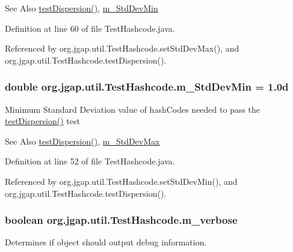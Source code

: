 \begin{DoxySeeAlso}{See Also}
\hyperlink{classorg_1_1jgap_1_1util_1_1_test_hashcode_a08e541143a78fdf8902cedac17e1f65d}{test\-Dispersion()}, \hyperlink{classorg_1_1jgap_1_1util_1_1_test_hashcode_a1601b935a90e3905a6107d9b88bbb47a}{m\-\_\-\-Std\-Dev\-Min} 
\end{DoxySeeAlso}


Definition at line 60 of file Test\-Hashcode.\-java.



Referenced by org.\-jgap.\-util.\-Test\-Hashcode.\-set\-Std\-Dev\-Max(), and org.\-jgap.\-util.\-Test\-Hashcode.\-test\-Dispersion().

\hypertarget{classorg_1_1jgap_1_1util_1_1_test_hashcode_a1601b935a90e3905a6107d9b88bbb47a}{
\subsubsection[{m\-\_\-\-Std\-Dev\-Min}]{\setlength{\rightskip}{0pt plus 5cm}double org.\-jgap.\-util.\-Test\-Hashcode.\-m\-\_\-\-Std\-Dev\-Min = 1.\-0d\hspace{0.3cm}{\ttfamily [private]}}}\label{classorg_1_1jgap_1_1util_1_1_test_hashcode_a1601b935a90e3905a6107d9b88bbb47a}
Minimum Standard Deviation value of hash\-Codes needed to pass the \hyperlink{classorg_1_1jgap_1_1util_1_1_test_hashcode_a08e541143a78fdf8902cedac17e1f65d}{test\-Dispersion()} test

\begin{DoxySeeAlso}{See Also}
\hyperlink{classorg_1_1jgap_1_1util_1_1_test_hashcode_a08e541143a78fdf8902cedac17e1f65d}{test\-Dispersion()}, \hyperlink{classorg_1_1jgap_1_1util_1_1_test_hashcode_a8c500454e1a3728534cc3c0c5f848b52}{m\-\_\-\-Std\-Dev\-Max} 
\end{DoxySeeAlso}


Definition at line 52 of file Test\-Hashcode.\-java.



Referenced by org.\-jgap.\-util.\-Test\-Hashcode.\-set\-Std\-Dev\-Min(), and org.\-jgap.\-util.\-Test\-Hashcode.\-test\-Dispersion().

\hypertarget{classorg_1_1jgap_1_1util_1_1_test_hashcode_ad23c284a29777b3928ae126657bb0cb9}{
\subsubsection[{m\-\_\-verbose}]{\setlength{\rightskip}{0pt plus 5cm}boolean org.\-jgap.\-util.\-Test\-Hashcode.\-m\-\_\-verbose\hspace{0.3cm}{\ttfamily [private]}}}\label{classorg_1_1jgap_1_1util_1_1_test_hashcode_ad23c284a29777b3928ae126657bb0cb9}
Determines if object should output debug information. 

